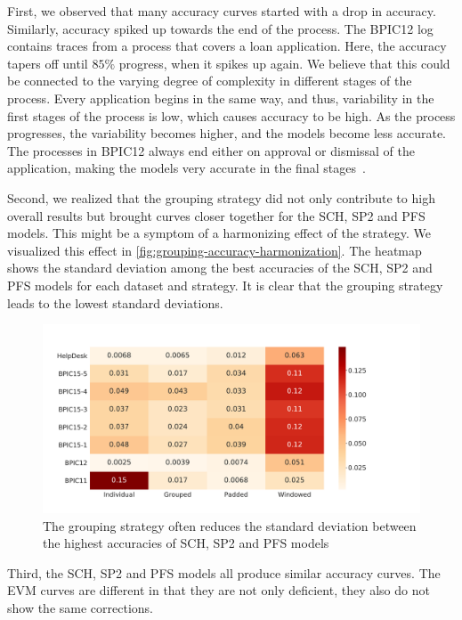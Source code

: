 First, we observed that many accuracy curves started with a drop in accuracy.
Similarly, accuracy spiked up towards the end of the process.
The BPIC12 log contains traces from a process that covers a loan application.
Here, the accuracy tapers off until $85\%$ progress, when it spikes up again.
We believe that this could be connected to the varying degree of complexity in different stages of the process.
Every application begins in the same way, and thus, variability in the first stages of the process is low, which causes accuracy to be high.
As the process progresses, the variability becomes higher, and the models become less accurate.
The processes in BPIC12 always end either on approval or dismissal of the application, making the models very accurate in the final stages~\cite{adriansyah2012mining}.

Second, we realized that the grouping strategy did not only contribute to high overall results but brought curves closer together for the SCH, SP2 and PFS models.
This might be a symptom of a harmonizing effect of the strategy.
We visualized this effect in \autoref{fig:grouping-accuracy-harmonization}.
The heatmap shows the standard deviation among the best accuracies of the SCH, SP2 and PFS models for each dataset and strategy.
It is clear that the grouping strategy leads to the lowest standard deviations.

\begin{figure}
    \centering
    \includegraphics[width=\textwidth]{gfx/grouping-accuracy-harmonization.pdf}
    \caption[Batching strategy harmonizes top accuracies]{The grouping strategy often reduces the standard deviation between the highest accuracies of SCH, SP2 and PFS models}
    \label{fig:grouping-accuracy-harmonization}
\end{figure}

Third, the SCH, SP2 and PFS models all produce similar accuracy curves.
The EVM curves are different in that they are not only deficient, they also do not show the same corrections.

